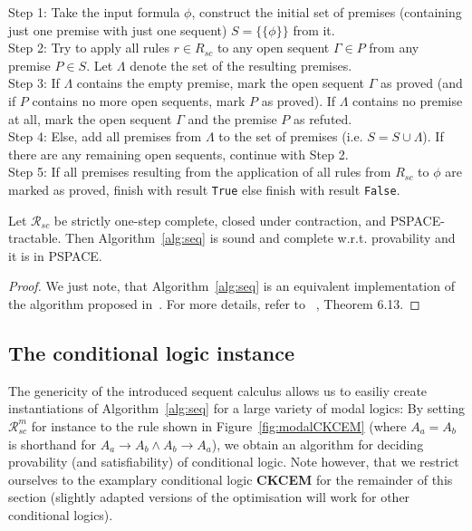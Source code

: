 \documentclass{entcs} \usepackage{entcsmacro}
\begin{document}
\begin{algorithm}[h]
\begin{alg}
\begin{upshape}
  Step 1: Take the input formula $\phi$, construct the initial set 
  of premises (containing just one premise with just one sequent)
  $S = \{\{\phi\}\}$ from it.\\
  Step 2: Try to apply all rules $r\in R_{sc}$ to any open sequent
  $\Gamma\in P$ from any premise $P\in S$. Let $\Lambda$ denote the set
  of the resulting premises.\\
  Step 3: If $\Lambda$ contains the empty premise, mark the open
  sequent $\Gamma$ as proved (and if $P$ contains no more open
  sequents, mark $P$ as proved). If $\Lambda$ contains no premise at
  all, mark the open sequent $\Gamma$ and the premise $P$ as refuted.\\
  Step 4: Else, add all premises from $\Lambda$ to the set of
  premises (i.e. $S=S\cup\Lambda$). If there are any remaining open
  sequents, continue with Step 2.\\
  Step 5: If all premises resulting from the application of all rules
  from $R_{sc}$ to $\phi$ are marked as proved, finish with result \verb|True|
  else finish with result \verb|False|.
\end{upshape}
\label{alg:seq}
\end{alg}
\end{algorithm}

\begin{proposition}
\begin{upshape}
Let $\mathcal{R}_{sc}$ be strictly one-step complete, closed under contraction,
and PSPACE-tractable. Then Algorithm~\ref{alg:seq} is sound and complete w.r.t. provability
and it is in PSPACE.
\end{upshape}
\end{proposition}

\begin{proof}
We just note, that Algorithm~\ref{alg:seq} is an equivalent implementation of the algorithm proposed
in~\cite{SchroderPattinson09}. For more details, refer to ~\cite{SchroderPattinson09}, Theorem 6.13.
\end{proof}

\subsection{The conditional logic instance}

The genericity of the introduced sequent calculus allows us to easiliy
create instantiations of Algorithm~\ref{alg:seq} for a large variety
of modal logics:
By setting $\mathcal R^m_{sc}$ for instance to the rule shown in
Figure~\ref{fig:modalCKCEM}
(where $A_a = A_b$ is shorthand for $A_a\rightarrow A_b\wedge A_b\rightarrow A_a$), we
obtain an algorithm for deciding provability (and satisfiability) of
conditional logic. Note however, that we restrict ourselves to the
examplary conditional logic \textbf{CKCEM} for the remainder of this section
(slightly adapted versions of the optimisation will work for other conditional logics).
\end{document}
